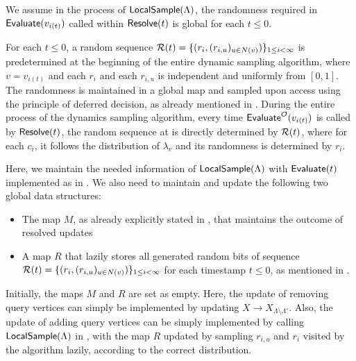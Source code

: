 We assume in the process of $\textnormal{\textsf{LocalSample}}(\Lambda)$, the randomness required in $\textnormal{\textsf{Evaluate}}(v_{i(t)})$ called within $\textnormal{\textsf{Resolve}}(t)$ is global for each $t\leq 0$.

\begin{remark}\label{remark:global-randomness}
For each $t\leq 0$, a random sequence $\mathcal{R}(t) = \{(r_i,(r_{i,u})_{u\in N(v)})\}_{1\leq i<\infty}$ is predetermined at the beginning of the entire dynamic sampling algorithm, where $v=v_{i(t)}$ and each $r_i$ and each $r_{i,u}$ is independent and uniformly from $[0,1]$.
The randomness is maintained in a global map and sampled upon access using the principle of deferred decision, as already mentioned in .
During the entire process of the dynamics sampling algorithm, every time $\textnormal{\textsf{Evaluate}}^{\mathcal{O}}(v_{i(t)})$ is called by $\textnormal{\textsf{Resolve}}(t)$, the random sequence at  is directly determined by $\mathcal{R}(t)$, where for each $c_i$, it follows the distribution of $\lambda_v$ and its randomness is determined by $r_i$.
\end{remark}

Here, we maintain the needed information of $\textnormal{\textsf{LocalSample}}(\Lambda)$ with $\textnormal{\textsf{Evaluate}}(t)$ implemented as in . We also need to maintain and update the following two global data structures:
\begin{itemize}
    \item The map $M$, as already explicitly stated in , that maintains the outcome of resolved updates
    \item A map $R$ that lazily stores all generated random bits of sequence $\mathcal{R}(t) = \{(r_i,(r_{i,u})_{u\in N(v)})\}_{1\leq i<\infty}$ for each timestamp $t\leq 0$, as mentioned in .
\end{itemize}

Initially, the maps $M$ and $R$ are set as empty. Here, the update of removing query vertices can simply be implemented by updating $X\to X_{\Lambda\setminus \Lambda'}$. Also, the update of adding query vertices can be simply implemented by calling $\textnormal{\textsf{LocalSample}}(\Lambda)$ in , with the map $R$ updated by sampling $r_{i,u}$ and $r_{i}$  visited by the algorithm lazily, according to the correct distribution.

